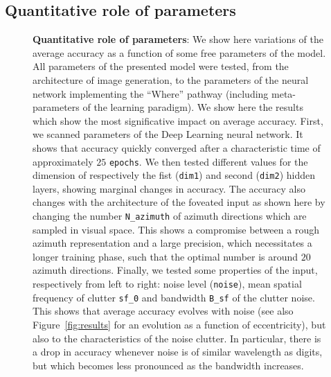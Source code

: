 \subsection{Quantitative role of parameters}
\fi
\begin{figure}[t!]%
\caption{
{\bf Quantitative role of parameters}: We show here variations of the average accuracy as a function of some free parameters of the model.  All parameters of the presented model were tested, from the architecture of image generation, to the parameters of the neural network implementing the ``Where'' pathway (including meta-parameters of the learning paradigm). We show here the results which show the most significative impact on average accuracy. %
\A First, we scanned parameters of the Deep Learning neural network. It shows that accuracy quickly converged after a characteristic time of approximately $25$ \texttt{epochs}. We then tested different values for the dimension of respectively the fist (\texttt{dim1}) and second (\texttt{dim2}) hidden layers, showing marginal changes in accuracy. %
\B The accuracy also changes with the architecture of the foveated input as shown here by changing the number \texttt{N\_azimuth} of azimuth directions which are sampled in visual space. This shows a compromise between a rough azimuth representation and a large precision, which necessitates a longer training phase, such that the optimal number is around $20$ azimuth directions. %
\C Finally, we tested some properties of the input, respectively from left to right: noise level (\texttt{noise}), mean spatial frequency of clutter \texttt{sf\_0} and bandwidth \texttt{B\_sf} of the clutter noise. This shows that average accuracy evolves with noise (see also Figure~\ref{fig:results} for an evolution as a function of eccentricity), but also to the characteristics of the noise clutter. In particular, there is a drop in accuracy whenever noise is of similar wavelength as digits, but which becomes less pronounced as the bandwidth increases. %
\label{fig:params}}%
\end{figure}%
